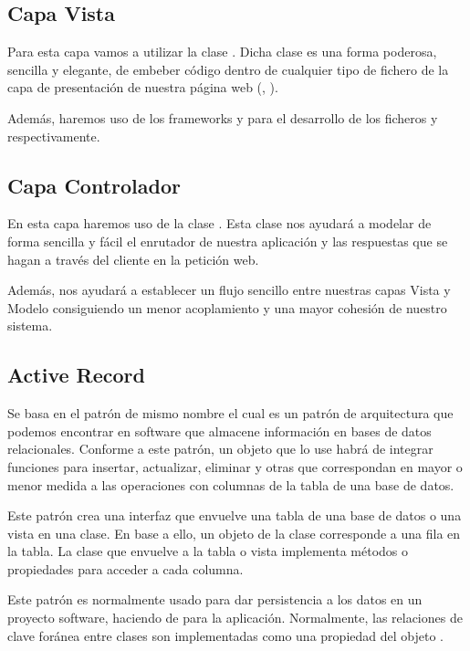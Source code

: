 \subsection{Capa Vista}

Para esta capa vamos a utilizar la clase . Dicha clase es
una forma poderosa, sencilla y elegante, de embeber código  dentro
de cualquier tipo de fichero de la capa de presentación de nuestra página web
(, ).

Además, haremos uso de los frameworks 
\cite{lang:coffescript} y  \cite{lang:sass} para el desarrollo de
los ficheros  y  respectivamente.

\subsection{Capa Controlador}
En esta capa haremos uso de la clase . Esta clase
nos ayudará a modelar de forma sencilla y fácil el enrutador de nuestra
aplicación y las respuestas que se hagan a través del cliente en la petición
web.

Además, nos ayudará a establecer un flujo sencillo entre nuestras capas Vista y
Modelo consiguiendo un menor acoplamiento y una mayor cohesión de nuestro
sistema.

\subsection{Active Record}
Se basa en el patrón de mismo nombre el cual es un patrón de arquitectura que
podemos encontrar en software que almacene información en bases de datos
relacionales. Conforme a este patrón, un objeto que lo use habrá de integrar
funciones para insertar, actualizar, eliminar y otras que correspondan en mayor
o menor medida a las operaciones con columnas de la tabla de una base de datos.

Este patrón crea una interfaz que envuelve una tabla de una base de datos o una
vista en una clase. En base a ello, un objeto de la clase corresponde a una fila
en la tabla. La clase que envuelve a la tabla o vista implementa métodos o
propiedades para acceder a cada columna.

Este patrón es normalmente usado para dar persistencia a los datos en un
proyecto software, haciendo de  para la aplicación. Normalmente,
las relaciones de clave foránea entre clases son implementadas como una
propiedad del objeto \cite{pattern:activerecord}.

